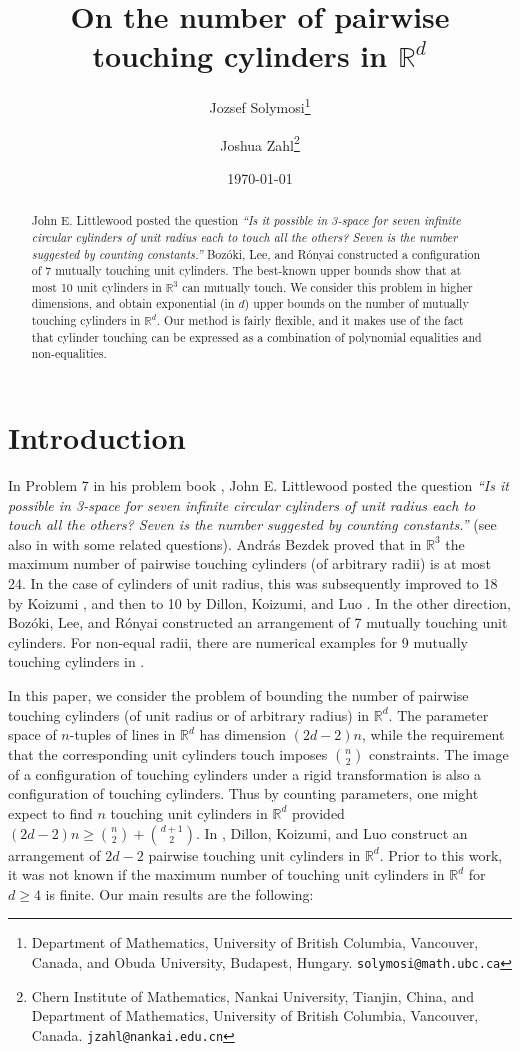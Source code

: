 \documentclass[letterpaper, reqno, 11pt]{article}
\title{On the number of pairwise touching cylinders in $\mathbb{R}^d$}
\author{
Jozsef Solymosi\thanks{
Department of Mathematics, University of British Columbia, Vancouver, Canada, and {O}buda University, Budapest, Hungary.
\texttt{solymosi@math.ubc.ca}}
\and
Joshua Zahl\thanks{
Chern Institute of Mathematics, Nankai University, Tianjin, China, and 
Department of Mathematics, University of British Columbia, Vancouver, Canada. \texttt{jzahl@nankai.edu.cn}
}}
\date{\today}
\numberwithin{equation}{section}
\newcommand{\RR}{\mathbb{R}}
\theoremstyle{remark}
\begin{document}
\maketitle



\begin{abstract}
John E. Littlewood posted the question {\em ``Is it possible in 3-space for seven infinite circular cylinders of unit radius each to touch all the others? Seven is the number suggested by counting constants.''} Boz\'oki, Lee, and R\'onyai constructed a configuration of 7 mutually touching unit cylinders. The best-known upper bounds show that at most 10 unit cylinders in $\mathbb{R}^3$ can mutually touch. We consider this problem in higher dimensions, and obtain exponential (in $d$) upper bounds on the number of mutually touching cylinders in $\mathbb{R}^d$. Our method is fairly flexible, and it makes use of the fact that cylinder touching can be expressed as a combination of polynomial equalities and non-equalities.
\end{abstract}

\section{Introduction}
In Problem 7 in his problem book \cite{Littlewood1968}, John E. Littlewood posted the question {\em ``Is it possible in 3-space for seven infinite circular cylinders of unit radius each to touch all the others? Seven is the number suggested by counting constants.''} (see also in \cite{BrassMoserPach2005} with some related questions). Andr\'as Bezdek \cite{Bezdek2005} proved that in $\mathbb{R}^3$ the maximum number of pairwise touching cylinders (of arbitrary radii) is at most 24. In the case of cylinders of unit radius, this was subsequently improved to 18 by Koizumi \cite{Koizumi2025}, and then to 10 by Dillon, Koizumi, and Luo \cite{DillonKoizumiLuo2025}. In the other direction, 
Boz\'oki, Lee, and R\'onyai \cite{BozokiLeeRonyai2017} constructed an arrangement of 7 mutually touching unit cylinders. For non-equal radii, there are numerical examples for 9 mutually touching cylinders in \cite{AlphaEvolve}.


In this paper, we consider the problem of bounding the number of pairwise touching cylinders (of unit radius or of arbitrary radius) in $\RR^d$. The parameter space of $n$-tuples of lines in $\RR^d$ has dimension $(2d-2)n$, while the requirement that the corresponding unit cylinders touch imposes $\binom{n}{2}$ constraints. The image of a configuration of touching cylinders under a rigid transformation is also a configuration of touching cylinders. Thus by counting parameters, one might expect to find $n$ touching unit cylinders in $\RR^d$ provided $(2d-2)n \geq \binom{n}{2} + \binom{d+1}{2}$. In \cite{DillonKoizumiLuo2025}, Dillon, Koizumi, and Luo construct an arrangement of $2d-2$ pairwise touching unit cylinders in $\RR^d$. Prior to this work, it was not known if the maximum number of touching unit cylinders in $\RR^d$ for $d\geq 4$ is finite. Our main results are the following:
\end{document}
